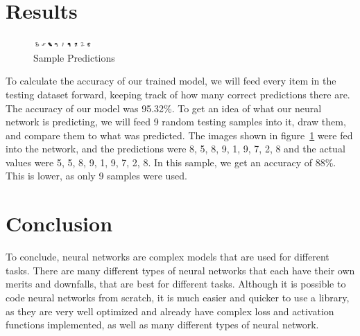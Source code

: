 \documentclass[a1,portrait]{a1poster}
\begin{document}
\begin{multicols}{2}
\section*{Results}
\begin{figure}
    \centering
    \includegraphics[width=0.2\textwidth]{assets/sample_predictions.png}
    \caption{Sample Predictions}
    \label{fig:sample-predictions}
\end{figure}
To calculate the accuracy of our trained model, we will feed every item in the testing dataset forward, keeping track of how many correct predictions there are. The accuracy of our model was 95.32\%. To get an idea of what our neural network is predicting, we will feed 9 random testing samples into it, draw them, and compare them to what was predicted. The images shown in figure~\ref{fig:sample-predictions} were fed into the network, and the predictions were 8, 5, 8, 9, 1, 9, 7, 2, 8 and the actual values were 5, 5, 8, 9, 1, 9, 7, 2, 8. In this sample, we get an accuracy of 88\%. This is lower, as only 9 samples were used.



\color{FireBrick} %

\section*{Conclusion}
To conclude, neural networks are complex models that are used for different tasks. There are many different types of neural networks that each have their own merits and downfalls, that are best for different tasks. Although it is possible to code neural networks from scratch, it is much easier and quicker to use a library, as they are very well optimized and already have complex loss and activation functions implemented, as well as many different types of neural network.


\end{multicols}
\end{document}
